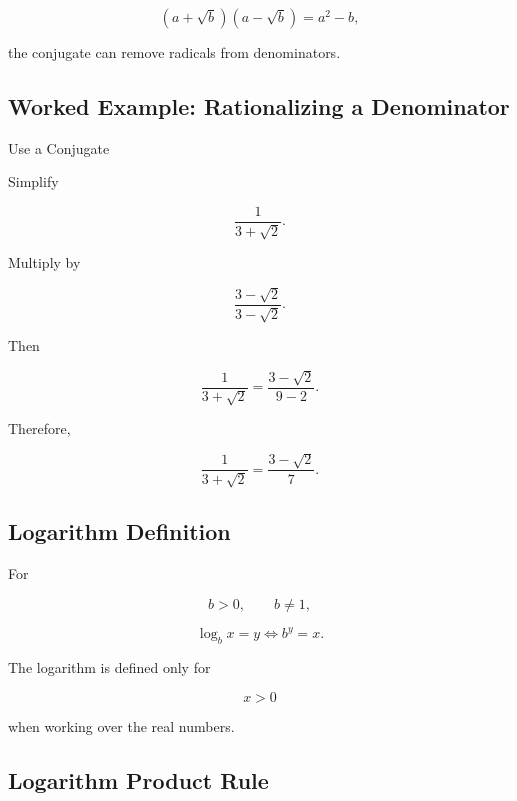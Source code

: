 \[
(a+\sqrt b)(a-\sqrt b)
=
a^2-b,
\]

the conjugate can remove radicals from denominators.

\subsection{Worked Example: Rationalizing a Denominator}
\label{subsec:worked-rationalize-denominator}

\begin{workedexamplebox}{Use a Conjugate}

Simplify

\[
\frac{1}{3+\sqrt2}.
\]

Multiply by

\[
\frac{3-\sqrt2}{3-\sqrt2}.
\]

Then

\[
\frac{1}{3+\sqrt2}
=
\frac{3-\sqrt2}{9-2}.
\]

Therefore,

\begin{answerbox}
\[
\boxed{
\frac{1}{3+\sqrt2}
=
\frac{3-\sqrt2}{7}.
}
\]
\end{answerbox}

\end{workedexamplebox}

\subsection{Logarithm Definition}
\label{subsec:logarithm-definition-reference}

For

\[
b>0,
\qquad
b\neq1,
\]

\[
\boxed{
\log_b x=y
\iff
b^y=x.
}
\]

The logarithm is defined only for

\[
\boxed{
x>0
}
\]

when working over the real numbers.

\subsection{Logarithm Product Rule}
\label{subsec:logarithm-product-rule}

